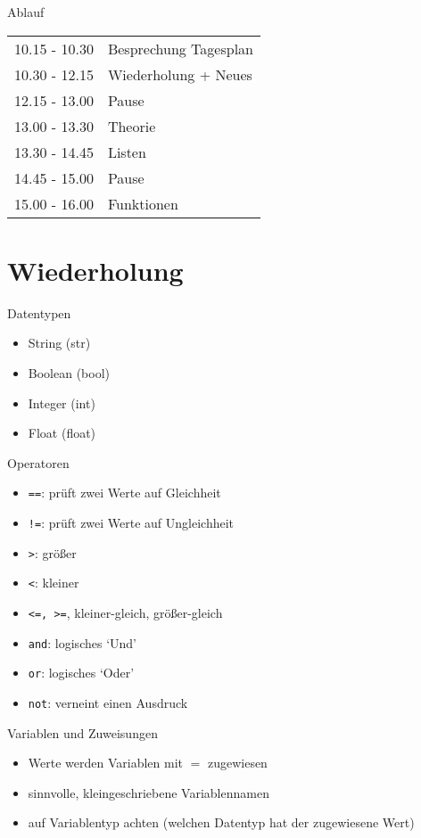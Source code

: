 \begin{frame}{Ablauf}
\begin{tabular}{ l l }
	10.15 - 10.30 & Besprechung Tagesplan\\
	10.30 - 12.15 & Wiederholung + Neues \\
	12.15 - 13.00 & Pause \\
	13.00 - 13.30 & Theorie\\
	13.30 - 14.45 & Listen\\
	14.45 - 15.00 & Pause\\
	15.00 - 16.00 & Funktionen\\
	
\end{tabular}
\end{frame}

\section{Wiederholung}


\begin{frame}[fragile]{Datentypen}
	\begin{itemize}
		\item String (str)
		\item Boolean (bool)
		\item Integer (int)
		\item Float (float)
	\end{itemize}
\end{frame}

\begin{frame}[fragile]{Operatoren}
	\begin{itemize}
		\item \texttt{==}: prüft zwei Werte auf Gleichheit
		\item \texttt{!=}: prüft zwei Werte auf Ungleichheit
		\item \texttt{>}: größer
		\item \texttt{<}: kleiner 
		\item \texttt{<=, >=}, kleiner-gleich, größer-gleich
		\item \texttt{and}: logisches `Und'
		\item \texttt{or}: logisches `Oder'
		\item \texttt{not}: verneint einen Ausdruck
	\end{itemize}
\end{frame}


\begin{frame}[fragile]{Variablen und Zuweisungen}
	\begin{itemize}
		\item Werte werden Variablen mit $=$ zugewiesen
		\item sinnvolle, kleingeschriebene Variablennamen
		\item auf Variablentyp achten (welchen Datentyp hat der zugewiesene Wert)
	\end{itemize}
\end{frame}

